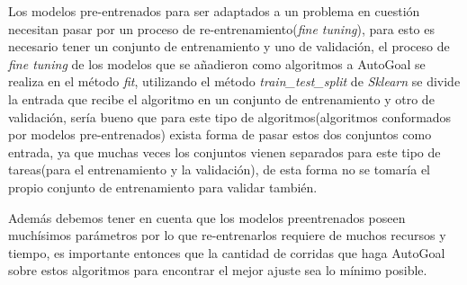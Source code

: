 \begin{recomendations}
    Los modelos pre-entrenados para ser adaptados a un problema en cuestión necesitan pasar por un proceso de re-entrenamiento(\textit{fine tuning}), para esto es necesario tener un conjunto de entrenamiento y uno de validación, el proceso de \textit{fine tuning} de los modelos que se añadieron como algoritmos a AutoGoal se realiza en el método \textit{fit}, utilizando el método \textit{train\_test\_split} de \textit{Sklearn} se divide la entrada que recibe el algoritmo en un conjunto de entrenamiento y otro de validación, sería bueno que para este tipo de algoritmos(algoritmos conformados por modelos pre-entrenados) exista forma de pasar estos dos conjuntos como entrada, ya que muchas veces los conjuntos vienen separados para este tipo de tareas(para el entrenamiento y la validación), de esta forma no se tomaría el propio conjunto de entrenamiento para validar también.

    Además debemos tener en cuenta que los modelos preentrenados poseen muchísimos parámetros por lo que re-entrenarlos requiere de muchos recursos y tiempo, es importante entonces que la cantidad de corridas que haga AutoGoal sobre estos algoritmos para encontrar el mejor ajuste sea lo mínimo posible.
\end{recomendations}
